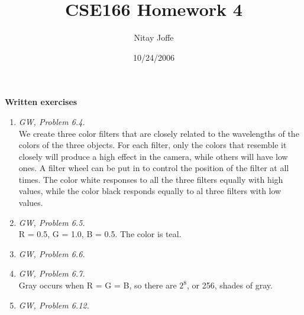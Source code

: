 \documentclass{article}
\author{Nitay Joffe}
\title{CSE166 Homework 4}
\date{10/24/2006}
\begin{document}
\maketitle

\noindent
{\bf Written exercises}
\begin{enumerate}
  \item \textit{GW, Problem 6.4.}\\
  We create three color filters that are closely related to the wavelengths of
  the colors of the three objects. For each filter, only the colors that
  resemble it closely will produce a high effect in the camera, while others
  will have low ones. A filter wheel can be put in to control the position of
  the filter at all times. The color white responses to all the three filters
  equally with high values, while the color black responds equally to al three
  filters with low values.
  \item \textit{GW, Problem 6.5.}\\
  R = 0.5, G = 1.0, B = 0.5. The color is teal.\\
  \item \textit{GW, Problem 6.6.}\\
  \bigskip \bigskip \bigskip \bigskip \bigskip \bigskip \bigskip \bigskip 
  \bigskip \bigskip \bigskip \bigskip \bigskip \bigskip \bigskip \bigskip
  \item \textit{GW, Problem 6.7.}\\
  Gray occurs when R = G = B, so there are $2^8$, or 256, shades of gray.\\
  \item \textit{GW, Problem 6.12.}\\
  \bigskip \bigskip \bigskip \bigskip \bigskip \bigskip \bigskip \bigskip
  \bigskip \bigskip \bigskip \bigskip \bigskip \bigskip \bigskip \bigskip
\end{enumerate}
\end{document}
